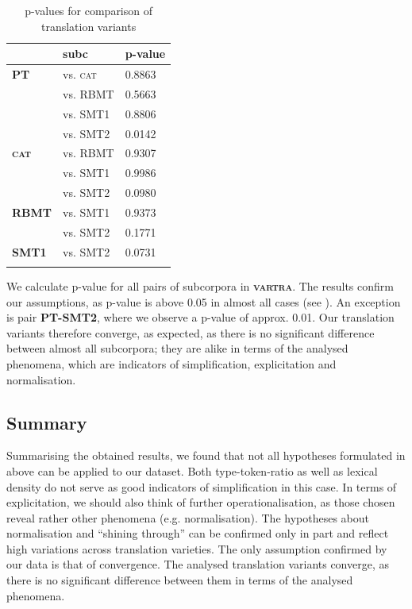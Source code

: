 \documentclass[output=paper]{LSP/langsci}
\begin{document}
\begin{table}
     \centering
     \begin{tabular}{lll}
          \lsptoprule
               & \textbf{subc}    & \textbf{p-value}  \\ \midrule
\textbf{PT}	   & vs. \textsc{cat}   & 0.8863     \\ 
	  	       & vs. RBMT  & 0.5663      \\ 
		       & vs. SMT1  & 0.8806       \\
		       & vs. SMT2  & 0.0142        \\ \midrule
\textbf{\textsc{cat}}   & vs. RBMT  & 0.9307         \\ 
			   & vs. SMT1  & 0.9986  		 \\
			   & vs. SMT2  & 0.0980           \\ \midrule
\textbf{RBMT}  & vs. SMT1  & 0.9373            \\ 
			   & vs. SMT2  & 0.1771			    \\ \midrule
\textbf{SMT1}  & vs. SMT2  & 0.0731 	         \\ 
\lspbottomrule
     \end{tabular}

 \caption{p-values for comparison of translation variants}
     \label{tab:4.5}
\end{table}   

We calculate p-value for all pairs of subcorpora in \textbf{\textsc{vartra}}. The results confirm our assumptions, as p-value is above 0.05 in almost all cases (see ). An exception is pair \textbf{PT-SMT2}, where we observe a p-value of approx. 0.01. Our translation variants therefore converge, as expected, as there is no significant difference between almost all subcorpora; they are alike in terms of the analysed phenomena, which are indicators of simplification, explicitation and normalisation.

\subsection{Summary}

Summarising the obtained results, we found that not all hypotheses formulated in  above can be applied to our dataset. Both type-token-ratio as well as lexical density do not serve as good indicators of simplification in this case. In terms of explicitation, we should also think of further operationalisation, as those chosen reveal rather other phenomena (e.g. normalisation).  The hypotheses about normalisation and “shining through” can be confirmed only in part and reflect high variations across translation varieties.  The only assumption confirmed by our data is that of convergence.  The analysed translation variants converge, as there is no significant difference between them in terms of the analysed phenomena.
\end{document}
